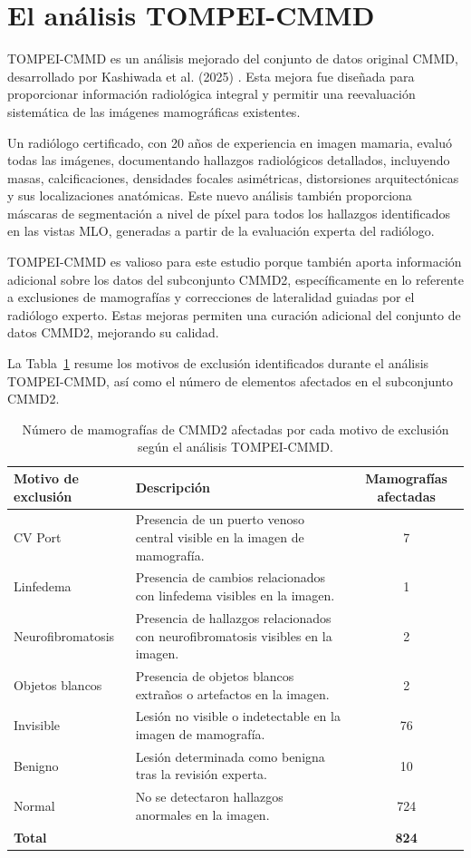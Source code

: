 \documentclass[a4paper,10pt]{book}
\begin{document}
\section{El análisis TOMPEI-CMMD}

TOMPEI-CMMD es un análisis mejorado del conjunto de datos original CMMD, desarrollado por Kashiwada et al. (2025) \cite{kashiwada_tompei-cmmd_2025}. Esta mejora fue diseñada para proporcionar información radiológica integral y permitir una reevaluación sistemática de las imágenes mamográficas existentes.

Un radiólogo certificado, con 20 años de experiencia en imagen mamaria, evaluó todas las imágenes, documentando hallazgos radiológicos detallados, incluyendo masas, calcificaciones, densidades focales asimétricas, distorsiones arquitectónicas y sus localizaciones anatómicas. Este nuevo análisis también proporciona máscaras de segmentación a nivel de píxel para todos los hallazgos identificados en las vistas MLO, generadas a partir de la evaluación experta del radiólogo.

TOMPEI-CMMD es valioso para este estudio porque también aporta información adicional sobre los datos del subconjunto CMMD2, específicamente en lo referente a exclusiones de mamografías y correcciones de lateralidad guiadas por el radiólogo experto. Estas mejoras permiten una curación adicional del conjunto de datos CMMD2, mejorando su calidad.

La Tabla~\ref{tab:tompei_exclusions} resume los motivos de exclusión identificados durante el análisis TOMPEI-CMMD, así como el número de elementos afectados en el subconjunto CMMD2.

\begin{table}[h!]
\caption[Motivos de exclusión en TOMPEI-CMMD]{Número de mamografías de CMMD2 afectadas por cada motivo de exclusión según el análisis TOMPEI-CMMD.}
\centering
\begin{tabular}{l p{6cm} c}
\toprule
\textbf{Motivo de exclusión} & \textbf{Descripción} & \textbf{Mamografías afectadas} \\
\midrule
CV Port & Presencia de un puerto venoso central visible en la imagen de mamografía. & 7 \\
Linfedema & Presencia de cambios relacionados con linfedema visibles en la imagen. & 1 \\
Neurofibromatosis & Presencia de hallazgos relacionados con neurofibromatosis visibles en la imagen. & 2 \\
Objetos blancos & Presencia de objetos blancos extraños o artefactos en la imagen. & 2 \\
Invisible & Lesión no visible o indetectable en la imagen de mamografía. & 76 \\
Benigno & Lesión determinada como benigna tras la revisión experta. & 10 \\
Normal & No se detectaron hallazgos anormales en la imagen. & 724 \\
\textbf{Total} & & \textbf{824} \\
\bottomrule
\end{tabular}
\label{tab:tompei_exclusions}
\end{table}
\end{document}
